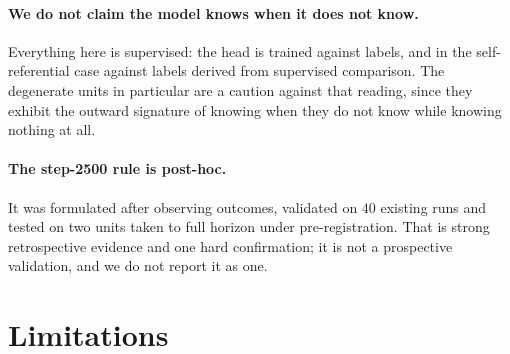\documentclass[11pt,a4paper]{article}
\begin{document}
\paragraph{We do not claim the model knows when it does not know.} Everything here is supervised: the
head is trained against labels, and in the self-referential case against labels derived from
supervised comparison. The degenerate units in particular are a caution against that reading, since
they exhibit the outward signature of knowing when they do not know while knowing nothing at all.

\paragraph{The step-2500 rule is post-hoc.} It was formulated after observing outcomes, validated on
$40$ existing runs and tested on two units taken to full horizon under pre-registration. That is
strong retrospective evidence and one hard confirmation; it is not a prospective validation, and we
do not report it as one.

\section{Limitations}
\label{sec:limits}
\end{document}
